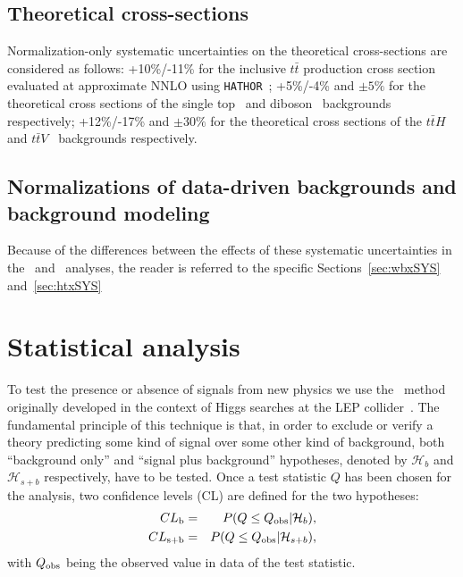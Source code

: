 \subsection{Theoretical cross-sections}
\label{sec:syst_bkgxsect}

Normalization-only systematic uncertainties on the theoretical
cross-sections are considered as follows:
+10\%/-11\% for the inclusive $t\bar{t}$
production cross section evaluated at approximate NNLO using 
\texttt{HATHOR}~\cite{ttbarxs}; +5\%/-4\% and $\pm 5\%$ 
for the theoretical cross sections of the single
top~\cite{stopxs,stopxs_2} and diboson~\cite{dibosonxs} backgrounds
respectively; +12\%/-17\% and  $\pm 30\%$ 
for the theoretical cross sections of the $t\bar{t}H$~\cite{lhcxs} and 
$t\bar{t}V$~\cite{ttbarVxs1,ttbarVxs2} backgrounds respectively.


\subsection{Normalizations of data-driven backgrounds and background modeling}
\label{sec:syst_norm}

Because of the differences between the effects of these systematic uncertainties
in the \wbx\ and \htx\ analyses, the reader is referred to the specific 
Sections~\ref{sec:wbxSYS} and~\ref{sec:htxSYS}


%
%


\section{Statistical analysis}\label{sec:cls}

To test the presence or absence of signals from new physics we use the
\ method~\cite{cls,cls_2} originally developed in the context of Higgs
searches at the LEP collider~\cite{Read:451614}.
The fundamental principle of this technique is that, in order to 
exclude or verify a theory predicting some kind of signal over some other kind
of background, both ``background only'' and ``signal plus background''
hypotheses, denoted by $\mathcal{H}_{b}$ and $\mathcal{H}_{s+b}$ 
respectively, have to be tested. Once a test statistic $Q$ has been chosen
for the analysis, two confidence levels (CL) are defined for the two hypotheses:
\begin{eqnarray}\label{eq:clbclsb}
\cls{b} &=& P(Q \leq Q_{\rm obs}|\mathcal{H}_{b}),\\
\cls{s+b} &=& P(Q \leq Q_{\rm obs}|\mathcal{H}_{s+b}),
\end{eqnarray}
with $Q_{\rm obs}$ being the observed value in data of the 
test statistic. %


